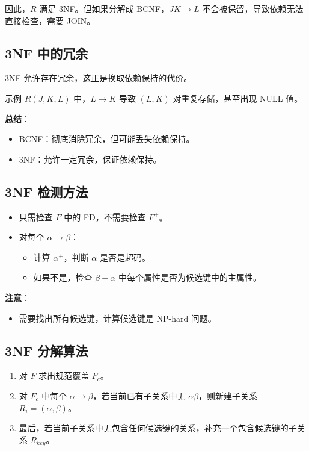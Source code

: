 因此，$R$ 满足 3NF。但如果分解成 BCNF，$JK \to L$ 不会被保留，导致依赖无法直接检查，需要 JOIN。

\subsection{3NF 中的冗余}

3NF 允许存在冗余，这正是换取依赖保持的代价。

示例 $R(J,K,L)$ 中，$L \to K$ 导致 $(L,K)$ 对重复存储，甚至出现 NULL 值。

\textbf{总结}：

\begin{itemize}
    \item BCNF：彻底消除冗余，但可能丢失依赖保持。
    \item 3NF：允许一定冗余，保证依赖保持。
\end{itemize}

\subsection{3NF 检测方法}

\begin{itemize}
    \item 只需检查 $F$ 中的 FD，不需要检查 $F^+$。
    \item 对每个 $\alpha \to \beta$：
    \begin{itemize}
        \item 计算 $\alpha^+$，判断 $\alpha$ 是否是超码。
        \item 如果不是，检查 $\beta - \alpha$ 中每个属性是否为候选键中的主属性。
    \end{itemize}
\end{itemize}

\textbf{注意}：

\begin{itemize}
    \item 需要找出所有候选键，计算候选键是 NP-hard 问题。
\end{itemize}

\subsection{3NF 分解算法}

\begin{enumerate}
    \item 对 $F$ 求出规范覆盖 $F_c$。
    \item 对 $F_c$ 中每个 $\alpha \to \beta$，若当前已有子关系中无 $\alpha \beta$，则新建子关系 $R_i = (\alpha, \beta)$。
    \item 最后，若当前子关系中无包含任何候选键的关系，补充一个包含候选键的子关系 $R_{key}$。
\end{enumerate}

